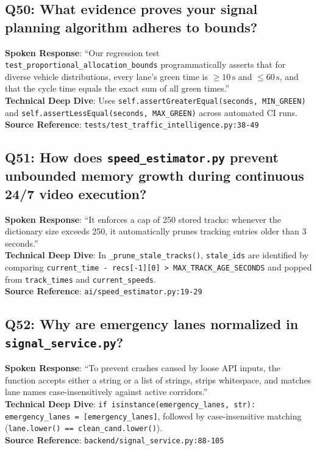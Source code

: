 \subsection*{Q50: What evidence proves your signal planning algorithm adheres to bounds?}
\begin{interviewbox}
\textbf{Spoken Response}: ``Our regression test \texttt{test\_proportional\_allocation\_bounds} programmatically asserts that for diverse vehicle distributions, every lane's green time is $\ge 10\,\text{s}$ and $\le 60\,\text{s}$, and that the cycle time equals the exact sum of all green times.''\\
\textbf{Technical Deep Dive}: Uses \texttt{self.assertGreaterEqual(seconds, MIN\_GREEN)} and \texttt{self.assertLessEqual(seconds, MAX\_GREEN)} across automated CI runs.\\
\textbf{Source Reference}: \texttt{tests/test\_traffic\_intelligence.py:38-49}
\end{interviewbox}

\subsection*{Q51: How does \texttt{speed\_estimator.py} prevent unbounded memory growth during continuous 24/7 video execution?}
\begin{interviewbox}
\textbf{Spoken Response}: ``It enforces a cap of 250 stored tracks: whenever the dictionary size exceeds 250, it automatically prunes tracking entries older than 3 seconds.''\\
\textbf{Technical Deep Dive}: In \texttt{\_prune\_stale\_tracks()}, \texttt{stale\_ids} are identified by comparing \texttt{current\_time - recs[-1][0] > MAX\_TRACK\_AGE\_SECONDS} and popped from \texttt{track\_times} and \texttt{current\_speeds}.\\
\textbf{Source Reference}: \texttt{ai/speed\_estimator.py:19-29}
\end{interviewbox}

\subsection*{Q52: Why are emergency lanes normalized in \texttt{signal\_service.py}?}
\begin{interviewbox}
\textbf{Spoken Response}: ``To prevent crashes caused by loose API inputs, the function accepts either a string or a list of strings, strips whitespace, and matches lane names case-insensitively against active corridors.''\\
\textbf{Technical Deep Dive}: \texttt{if isinstance(emergency\_lanes, str): emergency\_lanes = [emergency\_lanes]}, followed by case-insensitive matching (\texttt{lane.lower() == clean\_cand.lower()}).\\
\textbf{Source Reference}: \texttt{backend/signal\_service.py:88-105}
\end{interviewbox}

